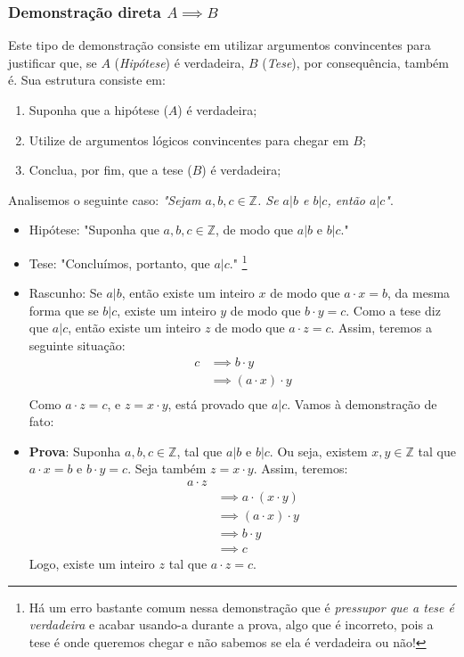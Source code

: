 \documentclass[13pt,letterpaper]{article}
\begin{document}
\subsubsection{Demonstração direta $A \implies B$}
Este tipo de demonstração consiste em utilizar argumentos convincentes para justificar que, se $A$ (\emph{Hipótese}) é verdadeira, $B$ (\emph{Tese}), por consequência, também é.  
Sua estrutura consiste em:
\begin{enumerate}
    \item Suponha que a hipótese ($A$) é verdadeira;
    \item Utilize de argumentos lógicos convincentes para chegar em $B$;
    \item Conclua, por fim, que a tese ($B$) é verdadeira;
\end{enumerate}
Analisemos o seguinte caso: \emph{"Sejam $a, b, c \in \mathbb{Z}$. Se $a|b$ e $b|c$, então $a|c$"}.
\begin{itemize}
    \item Hipótese: "Suponha que $a, b, c \in \mathbb{Z}$, de modo que $a|b$ e $b|c$."
    \item Tese: "Concluímos, portanto, que $a|c$." \footnote{Há um erro bastante comum nessa demonstração que é \emph{pressupor que a tese é verdadeira} e acabar usando-a durante a prova, algo que é incorreto, pois a tese é onde queremos chegar e não sabemos se ela é verdadeira ou não!} 
    \item Rascunho: Se $a|b$, então existe um inteiro $x$ de modo que $a \cdot x = b$, da mesma forma que se $b|c$, existe um inteiro $y$ de modo que $b \cdot y = c$. Como a tese diz que $a|c$, então existe um inteiro $z$ de modo que $a \cdot z = c$.
    Assim, teremos a seguinte situação:
    \begin{align*}
    c &\implies 
    b \cdot y \\ &\implies
    (a \cdot x) \cdot y \\
    \end{align*}
    Como $a \cdot z = c$, e $z = x \cdot y$, está provado que $a|c$. Vamos à demonstração de fato:
    \item \textbf{Prova}: Suponha $a, b, c \in \mathbb{Z}$, tal que $a|b$ e $b|c$. Ou seja, existem $x, y \in \mathbb{Z}$
    tal que $a \cdot x = b$ e $b \cdot y = c$. Seja também $z = x \cdot y$. Assim, teremos: 
    \begin{align*}
        a \cdot z \\ &\implies
        a \cdot (x \cdot y) \\ &\implies
        (a \cdot x) \cdot y \\ &\implies
        b \cdot y \\ &\implies
        c
    \end{align*}
    Logo, existe um inteiro $z$ tal que $a \cdot z = c$.
\end{itemize}
\end{document}
